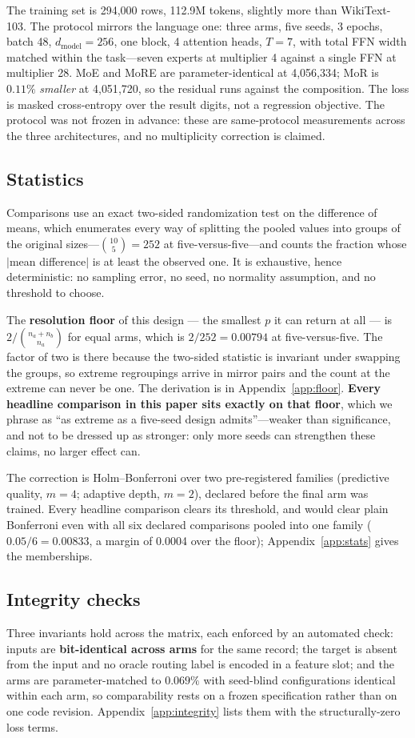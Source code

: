 The training set is 294{,}000 rows, 112.9M tokens, slightly more than
WikiText-103. The protocol mirrors the language one: three arms, five seeds,
3 epochs, batch 48, $d_{\text{model}} = 256$, one block, 4 attention heads,
$T = 7$, with total FFN width matched within the task---seven experts at
multiplier 4 against a single FFN at multiplier 28. MoE and MoRE are
parameter-identical at 4{,}056{,}334; MoR is $0.11\%$ \emph{smaller} at
4{,}051{,}720, so the residual runs against the composition. The loss is masked
cross-entropy over the result digits, not a regression objective. The protocol
was not frozen in advance: these are same-protocol measurements across the three
architectures, and no multiplicity correction is claimed.

\subsection{Statistics}
\label{sec:stats}

Comparisons use an exact two-sided randomization test on the difference of means,
which enumerates every way of splitting the pooled values into groups of the
original sizes---$\binom{10}{5} = 252$ at five-versus-five---and counts the
fraction whose $|$mean difference$|$ is at least the observed one. It is
exhaustive, hence deterministic: no sampling error, no seed, no normality
assumption, and no threshold to choose.

The \textbf{resolution floor} of this design --- the smallest $p$ it can return at
all --- is $2/\binom{n_a+n_b}{n_a}$ for equal arms, which is $2/252 = 0.00794$ at
five-versus-five. The factor of two is there because the two-sided statistic is
invariant under swapping the groups, so extreme regroupings arrive in mirror pairs
and the count at the extreme can never be one.
The derivation is in Appendix~\ref{app:floor}.
\textbf{Every headline comparison in this paper sits exactly on that floor}, which
we phrase as ``as extreme as a five-seed design admits''---weaker than
significance, and not to be dressed up as stronger: only more seeds can
strengthen these claims, no larger effect can.

The correction is Holm--Bonferroni over two pre-registered families (predictive quality, $m=4$; adaptive depth, $m=2$), declared before the final arm was trained. Every headline comparison clears its threshold, and would clear plain Bonferroni even with all six declared comparisons pooled into one family ($0.05/6=0.00833$, a margin of 0.0004 over the floor); Appendix~\ref{app:stats} gives the memberships.

\subsection{Integrity checks}\label{sec:integrity} Three invariants hold across the matrix, each enforced by an automated check: inputs are \textbf{bit-identical across arms} for the same record; the target is absent from the input and no oracle routing label is encoded in a feature slot; and the arms are parameter-matched to $0.069\%$ with seed-blind configurations identical within each arm, so comparability rests on a frozen specification rather than on one code revision. Appendix~\ref{app:integrity} lists them with the structurally-zero loss terms.
